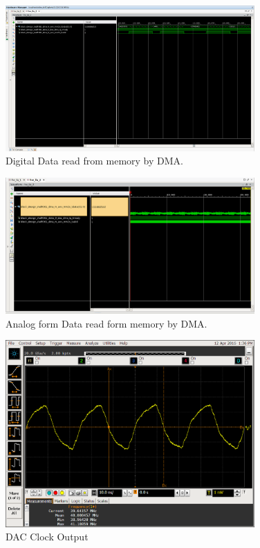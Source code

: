 \begin{figure}[htbp]
    \centering
    \includegraphics[width=0.85\textwidth]{./figures/ila_dataflow}
    \caption{ Digital Data read from memory by DMA.
    \label{fig:dataflowdig}}
\end{figure}

\begin{figure}[htbp]
    \centering
    \includegraphics[width=0.85\textwidth]{./figures/ltedac_ila}
    \caption{ Analog form Data read form memory by DMA.
    \label{fig:dataflowana}}
\end{figure}

\begin{figure}[htbp]
    \centering
    \includegraphics[width=0.85\textwidth]{./figures/oscill_ad9361_dac_clk}
    \caption{ DAC Clock Output
    \label{fig:dacclk}}
\end{figure}


